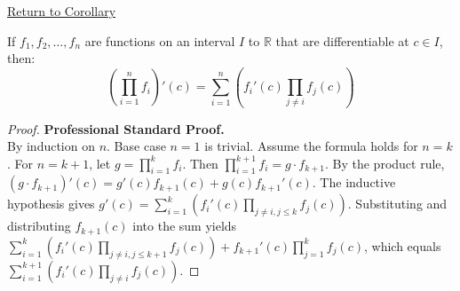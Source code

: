 \newpage
{}
\label{prf:finite-product-rule}

\begin{remark*}[Return]
\hyperref[cor:extended-product-rule]{Return to Corollary}
\end{remark*}

\begin{theorem*}
If $f_1, f_2, \ldots, f_n$ are functions on an interval $I$ to $\mathbb{R}$ that are differentiable at $c \in I$, then:
\[ \left( \prod_{i=1}^{n} f_i \right)'(c) = \sum_{i=1}^{n} \left( f_i'(c) \prod_{j \neq i} f_j(c) \right) \]
\end{theorem*}

\begin{proof}
\textbf{Professional Standard Proof.}~\\
By induction on $n$. Base case $n=1$ is trivial. Assume the formula holds for $n=k$. For $n=k+1$, let $g = \prod_{i=1}^{k} f_i$. Then $\prod_{i=1}^{k+1} f_i = g \cdot f_{k+1}$. By the product rule, $(g \cdot f_{k+1})'(c) = g'(c)f_{k+1}(c) + g(c)f_{k+1}'(c)$. The inductive hypothesis gives $g'(c) = \sum_{i=1}^{k} \left( f_i'(c) \prod_{j \neq i, j \leq k} f_j(c) \right)$. Substituting and distributing $f_{k+1}(c)$ into the sum yields $\sum_{i=1}^{k} \left( f_i'(c) \prod_{j \neq i, j \leq k+1} f_j(c) \right) + f_{k+1}'(c) \prod_{j=1}^{k} f_j(c)$, which equals $\sum_{i=1}^{k+1} \left( f_i'(c) \prod_{j \neq i} f_j(c) \right)$.
\end{proof}


